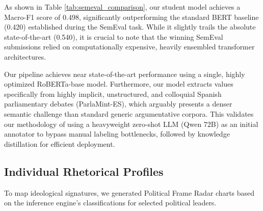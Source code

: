 \documentclass[11pt,a4paper]{article}
\begin{document}
As shown in Table \ref{tab:semeval_comparison}, our student model achieves a Macro-F1 score of 0.498, significantly outperforming the standard BERT baseline (0.420) established during the SemEval task. While it slightly trails the absolute state-of-the-art (0.540), it is crucial to note that the winning SemEval submissions relied on computationally expensive, heavily ensembled transformer architectures. 

Our pipeline achieves near state-of-the-art performance using a single, highly optimized RoBERTa-base model. Furthermore, our model extracts values specifically from highly implicit, unstructured, and colloquial Spanish parliamentary debates (ParlaMint-ES), which arguably presents a denser semantic challenge than standard generic argumentative corpora. This validates our methodology of using a heavyweight zero-shot LLM (Qwen 72B) as an initial annotator to bypass manual labeling bottlenecks, followed by knowledge distillation for efficient deployment.

\subsection{Individual Rhetorical Profiles}
To map ideological signatures, we generated Political Frame Radar charts based on the inference engine's classifications for selected political leaders.
\end{document}
